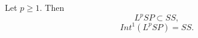 \begin{theoremnon}
Let $p\geq 1.$ Then
$$ L^p SP \subset SS,$$
$$ Int^1(L^p SP) = SS. $$
\end{theoremnon}